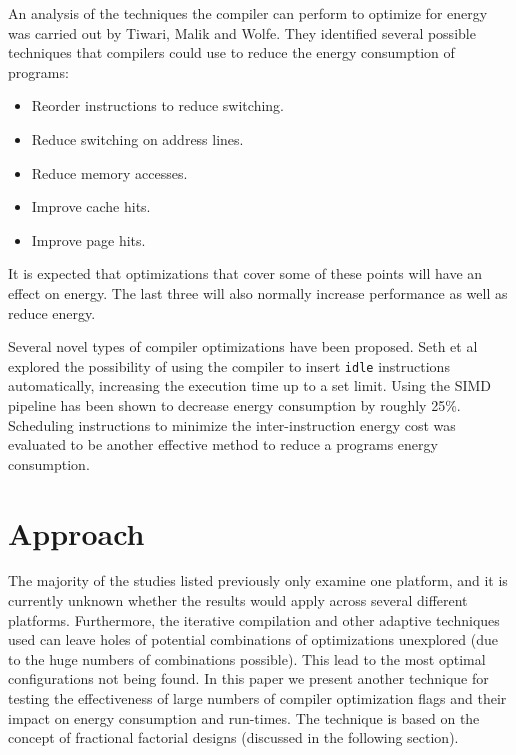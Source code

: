 \documentclass[twocolumn]{article}
\begin{document}
An analysis of the techniques the compiler can perform to optimize for energy was carried out by Tiwari, Malik and Wolfe\cite{CompilationTechniquesForLowEnergy}. They identified several possible techniques that compilers could use to reduce the energy consumption of programs:
\begin{itemize}
	\setlength{\itemsep}{0em}
	\vspace{-1mm}

	\item Reorder instructions to reduce switching.
	\item Reduce switching on address lines.
	\item Reduce memory accesses.
	\item Improve cache hits.
	\item Improve page hits.
\end{itemize}

It is expected that optimizations that cover some of these points will have an effect on energy. The last three will also normally increase performance as well as reduce energy.


Several novel types of compiler optimizations have been proposed. Seth et al\cite{Seth2001} explored the possibility of using the compiler to insert \texttt{idle} instructions automatically, increasing the execution time up to a set limit. Using the SIMD pipeline has been shown to decrease energy consumption\cite{Ibrahim2009} by roughly 25\%. Scheduling instructions to minimize the inter-instruction energy cost was evaluated to be another effective method to reduce a programs energy consumption\cite{Parikh}.



\section{Approach}

The majority of the studies listed previously only examine one platform, and it is currently unknown whether the results would apply across several different platforms. Furthermore, the iterative compilation and other adaptive techniques used can leave holes of potential combinations of optimizations unexplored (due to the huge numbers of combinations possible). This lead to the most optimal configurations not being found. In this paper we present another technique for testing the effectiveness of large numbers of compiler optimization flags and their impact on energy consumption and run-times. The technique is based on the concept of fractional factorial designs (discussed in the following section).
\end{document}
